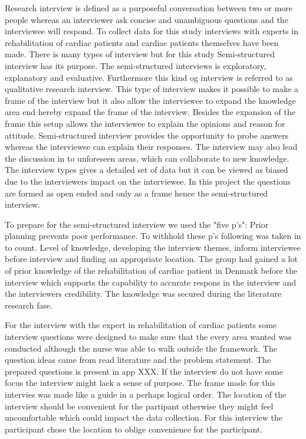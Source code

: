 Research interview is defined as a purposeful conversation between two or more people whereas an interviewer ask concise and unambiguous questions and the interviewee will respond. To collect data for this study interviews with experts in rehabilitation of  cardiac patients and cardiac patients themselves have been made. 
There is many types of interview but for this study Semi-structured interview has its purpose. The semi-structured interviews is exploratory, explanatory and evaluative. Furthermore this kind og interview is referred to as qualitative research interview.
This type of interview makes it possible to make a frame of the interview but it also allow the interviewee to expand the knowledge area end hereby expand the frame of the interview. Besides the expansion of the frame this setup allows the interviewee to explain the opinions and reason for attitude. Semi-structured interview provides the opportunity to probe answers whereas the interviewee can explain their responses. The interview may also lead the discussion in to unforeseen areas, which can collaborate to new knowledge. The interview types gives a detailed set of data but it can be viewed as biased due to the interviewers impact on the interviewee. 
In this project the questions are formed as open ended and only as a frame hence the semi-structured interview.

To prepare for the semi-structured interview we used the "five p's": Prior planning prevents poor performance. To withhold these p's following was taken in to count. Level of knowledge, developing the interview themes, inform interviewee before interview and finding an appropriate location. 
The group had gained a lot of prior knowledge of the rehabilitation of cardiac patient in Denmark before the interview which supports the capability to accurate respons in the interview and the interviewers credibility. The knowledge was secured during the literature research fase. 

For the interview with the expert in rehabilitation of cardiac patients some interview questions were designed to make sure that the every area wanted was conducted although the nurse was able to walk outside the framework. The question ideas came from read literature and the problem statement. The prepared questions is present in app XXX. If the interview do not have some focus the interview might lack a sense of purpose. The frame made for this intervies was made like a guide in a perhaps logical order. The location of the interview should be convenient for the partipant otherwise they might feel uncomfortable which could impact the data collection. For this interview the participant chose the location to oblige convenience for the participant. 

